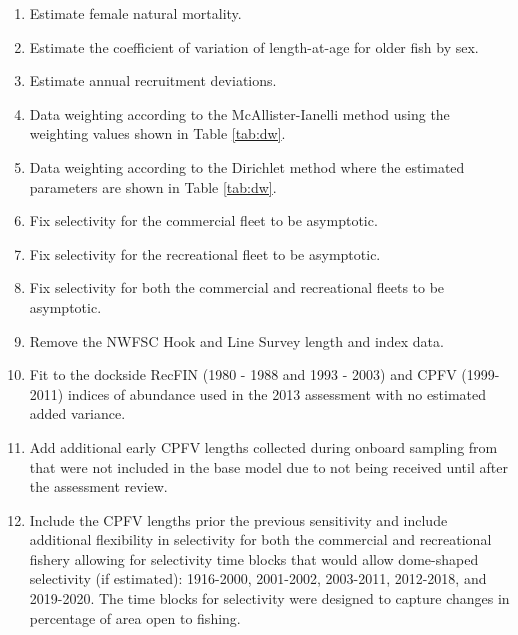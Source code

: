\documentclass[11pt,
  english,
  a4paper,
]{article}
\begin{document}
\begin{enumerate}
   
  \item Estimate female natural mortality.

  \item Estimate the coefficient of variation of length-at-age for older fish by sex. 

  \item Estimate annual recruitment deviations.

  \item Data weighting according to the McAllister-Ianelli method using the weighting values shown in Table \ref{tab:dw}. 
  
  \item Data weighting according to the Dirichlet method where the estimated parameters are shown in Table \ref{tab:dw}.

  \item Fix selectivity for the commercial fleet to be asymptotic. 
  
  \item Fix selectivity for the recreational fleet to be asymptotic. 
    
  \item Fix selectivity for both the commercial and recreational fleets to be asymptotic. 

  \item Remove the NWFSC Hook and Line Survey length and index data.
  
  \item Fit to the dockside RecFIN  (1980 - 1988 and 1993 - 2003) and CPFV (1999-2011) indices of abundance used in the 2013 assessment with no estimated added variance. 

  \item Add additional early CPFV lengths collected during onboard sampling from that were not included in the base model due to not being received until after the assessment review.

  \item Include the CPFV lengths prior the previous sensitivity and include additional flexibility in selectivity for both the commercial and recreational fishery allowing for selectivity time blocks that would allow dome-shaped selectivity (if estimated): 1916-2000, 2001-2002, 2003-2011, 2012-2018, and 2019-2020. The time blocks for selectivity were designed to capture changes in percentage of area open to fishing. 
  
\end{enumerate}
\end{document}
